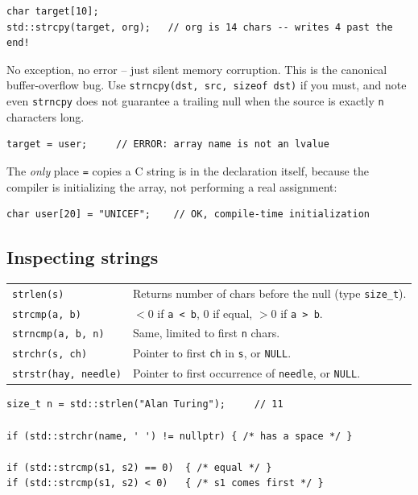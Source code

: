 \documentclass[11pt]{article}
\begin{document}
\begin{warnbox}
\begin{verbatim}
char target[10];
std::strcpy(target, org);   // org is 14 chars -- writes 4 past the end!
\end{verbatim}
No exception, no error -- just silent memory corruption. This is the
canonical buffer-overflow bug. Use \texttt{strncpy(dst, src, sizeof
dst)} if you must, and note even \texttt{strncpy} does not guarantee
a trailing null when the source is exactly \texttt{n} characters long.
\end{warnbox}

\begin{warnbox}
\begin{verbatim}
target = user;     // ERROR: array name is not an lvalue
\end{verbatim}
The \emph{only} place \texttt{=} copies a C string is in the
declaration itself, because the compiler is initializing the array,
not performing a real assignment:
\begin{verbatim}
char user[20] = "UNICEF";    // OK, compile-time initialization
\end{verbatim}
\end{warnbox}

\subsection{Inspecting strings}

\begin{center}
\small
\begin{tabular}{ll}
\texttt{strlen(s)} & Returns number of chars before the null (type \texttt{size\_t}). \\
\texttt{strcmp(a, b)} & $<0$ if \texttt{a < b}, 0 if equal, $>0$ if \texttt{a > b}. \\
\texttt{strncmp(a, b, n)} & Same, limited to first \texttt{n} chars. \\
\texttt{strchr(s, ch)} & Pointer to first \texttt{ch} in \texttt{s}, or \texttt{NULL}. \\
\texttt{strstr(hay, needle)} & Pointer to first occurrence of \texttt{needle}, or \texttt{NULL}. \\
\end{tabular}
\normalsize
\end{center}

\begin{examplebox}
\begin{verbatim}
size_t n = std::strlen("Alan Turing");     // 11

if (std::strchr(name, ' ') != nullptr) { /* has a space */ }

if (std::strcmp(s1, s2) == 0)  { /* equal */ }
if (std::strcmp(s1, s2) < 0)   { /* s1 comes first */ }
\end{verbatim}
\end{examplebox}
\end{document}
